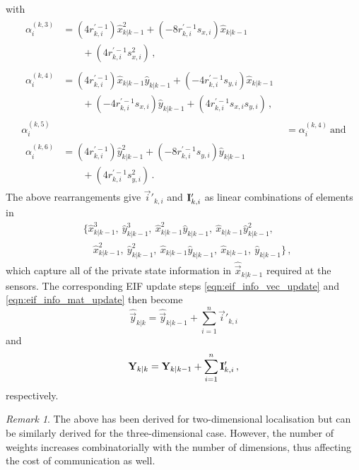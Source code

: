 \documentclass[10pt,letterpaper,oneside,twocolumn,journal]{IEEEtran}
\theoremstyle{definition}
\theoremstyle{definition}
\theoremstyle{remark}
\newtheorem*{remark}{Remark}
\begin{document}
with
\begin{align*}
    \begin{split}
        \alpha_i^{(k,3)} &= (4r_{k,i}^{\prime-1})\hat{x}_{k|k-1}^2 + (-8r_{k,i}^{\prime-1}s_{x,i})\hat{x}_{k|k-1} \\
        &\qquad+ (4r_{k,i}^{\prime-1}s_{x,i}^2)\,,
    \end{split}\\
    \begin{split}
        \alpha_i^{(k,4)} &= (4r_{k,i}^{\prime-1})\hat{x}_{k|k-1}\hat{y}_{k|k-1} + (-4r_{k,i}^{\prime-1}s_{y,i})\hat{x}_{k|k-1}  \\
        &\qquad+ (-4r_{k,i}^{\prime-1}s_{x,i})\hat{y}_{k|k-1} + (4r_{k,i}^{\prime-1}s_{x,i}s_{y,i})\,,
    \end{split}\\
    \alpha_i^{(k,5)} &= \alpha_i^{(k,4)}\ \textrm{and} \\
    \begin{split}
        \alpha_i^{(k,6)} &= (4r_{k,i}^{\prime-1})\hat{y}_{k|k-1}^2 + (-8r_{k,i}^{\prime-1}s_{y,i})\hat{y}_{k|k-1} \\
        &\qquad+ (4r_{k,i}^{\prime-1}s_{y,i}^2)\,.
    \end{split}
\end{align*}
The above rearrangements give $\vec{i}'_{k,i}$ and ${{\mathbf{I}}}'_{k,i}$ as linear combinations of elements in
\begin{equation}
    \begin{split}
        &\{ \hat{x}_{k|k-1}^3,\ \hat{y}_{k|k-1}^3,\ \hat{x}_{k|k-1}^2\hat{y}_{k|k-1},\ \hat{x}_{k|k-1}\hat{y}_{k|k-1}^2,\\
        &\quad \hat{x}_{k|k-1}^2,\ \hat{y}_{k|k-1}^2,\ \hat{x}_{k|k-1}\hat{y}_{k|k-1},\ \hat{x}_{k|k-1},\ \hat{y}_{k|k-1}\}\,,
    \end{split} \label{eqn:weights_to_broadcast}
\end{equation}
which capture all of the private state information in $\hat{\vec{x}}_{k|k-1}$ required at the sensors. The corresponding EIF update steps \eqref{eqn:eif_info_vec_update} and \eqref{eqn:eif_info_mat_update} then become
\begin{equation}
    \hat{\vec{y}}_{k|k} = \hat{\vec{y}}_{k|k-1} + \sum^n_{i=1}\vec{i}'_{k,i} \label{eqn:eif_modified_vec_update}
\end{equation}
and
\begin{equation}
    \mat{Y}_{k|k} = \mat{Y}_{k|k-1} + \sum^n_{i=1}\mat{I}'_{k,i}\,, \label{eqn:eif_modified_mat_update}
\end{equation}
respectively.
\begin{remark}
    The above has been derived for two-dimensional localisation but can be similarly derived for the three-dimensional case. However, the number of weights increases combinatorially with the number of dimensions, thus affecting the cost of communication as well.
\end{remark}
\end{document}
